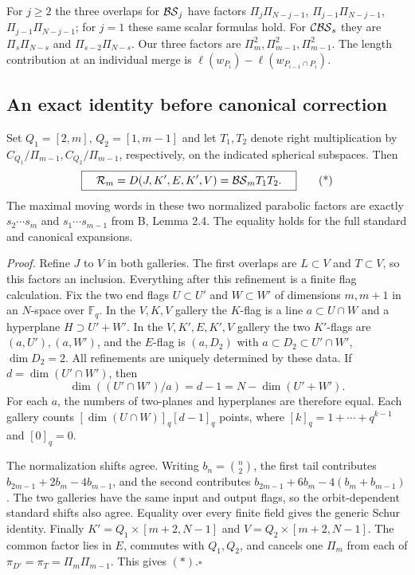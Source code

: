 For $j\ge2$ the three overlaps for $\mathcal{BS}_j$ have factors
$\Pi_j\Pi_{N-j-1}$, $\Pi_{j-1}\Pi_{N-j-1}$,
$\Pi_{j-1}\Pi_{N-j-1}$; for $j=1$ these same scalar formulas hold.
For $\mathcal{CBS}_s$ they are $\Pi_s\Pi_{N-s}$ and $\Pi_{s-2}\Pi_{N-s}$.
Our three factors are $\Pi_m^2,\Pi_{m-1}^2,\Pi_{m-1}^2$.
The length contribution at an individual merge is
$\ell(w_{P_i})-\ell(w_{P_{i-1}\cap P_i})$.

\clearpage
\subsection{An exact identity before canonical correction}

Set $Q_1=[2,m]$, $Q_2=[1,m-1]$ and let $T_1,T_2$ denote right
multiplication by $C_{Q_1}/\Pi_{m-1},C_{Q_2}/\Pi_{m-1}$, respectively,
on the indicated spherical subspaces. Then
\[
 \boxed{\quad\mathcal R_m=D(J,K',E,K',V)=\mathcal{BS}_m T_1T_2.\quad}                 \tag{*}
\]
The maximal moving words in these two normalized parabolic factors
are exactly $s_2\cdots s_m$ and $s_1\cdots s_{m-1}$ from B, Lemma
2.4. The equality holds for the full standard and canonical expansions.

\smallskip
\noindent\textit{Proof.}
Refine $J$ to $V$ in both galleries. The first overlaps are $L\subset V$
and $T\subset V$, so this factors an inclusion. Everything after this
refinement is a finite flag calculation. Fix the two end flags
$U\subset U'$ and $W\subset W'$ of dimensions $m,m+1$ in an
$N$-space over $\mathbb F_q$. In the $V,K,V$ gallery the $K$-flag is
a line $a\subset U\cap W$ and a hyperplane $H\supset U'+W'$.
In the $V,K',E,K',V$ gallery the two $K'$-flags are $(a,U'),(a,W')$,
and the $E$-flag is $(a,D_2)$ with
$a\subset D_2\subset U'\cap W'$, $\dim D_2=2$. All refinements are
uniquely determined by these data. If $d=\dim(U'\cap W')$, then
\[
 \dim((U'\cap W')/a)=d-1=N-\dim(U'+W').
\]
For each $a$, the numbers of two-planes and hyperplanes are therefore
equal. Each gallery counts $[\dim(U\cap W)]_q[d-1]_q$ points, where
$[k]_q=1+\cdots+q^{k-1}$ and $[0]_q=0$.

The normalization shifts agree. Writing $b_n=\binom n2$, the first
tail contributes $b_{2m-1}+2b_m-4b_{m-1}$, and the second contributes
$b_{2m-1}+6b_m-4(b_m+b_{m-1})$. The two galleries have the same input and output flags, so the orbit-dependent standard shifts also agree.
Equality over every finite field gives the generic Schur identity.
Finally $K'=Q_1\times[m+2,N-1]$ and $V=Q_2\times[m+2,N-1]$.
The common factor lies in $E$, commutes with $Q_1,Q_2$, and cancels
one $\Pi_m$ from each of $\pi_{D'}=\pi_T=\Pi_m\Pi_{m-1}$.
This gives $(*)$.\hfill$\square$

